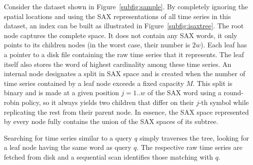 Consider the dataset shown in Figure~\ref{subfig:sample}. By completely ignoring the spatial locations and using the SAX representations of all time series in this dataset, an \isax index \cite{shieh2008kdd} can be built as illustrated in Figure~\ref{subfig:isaxtree}. The root node captures the complete \isax space. It does not contain any SAX words, it only points to its children nodes (in the worst case, their number is $2w$). Each leaf has a pointer to a disk file containing the raw time series that it represents. The leaf itself also stores the \isax word of highest cardinality among these time series. An internal node designates a split in SAX space and is created when the number of time series contained by a leaf node exceeds a fixed capacity $M$. This split is binary and is made at a given position $j=1..w$ of the SAX word using a round-robin policy, so it always yields two children that differ on their $j$-th symbol while replicating the rest from their parent node. In essence, the SAX space represented by every node fully contains the union of the SAX spaces of its subtree.

Searching for time series similar to a query $q$ simply traverses the \isax tree, looking for a leaf node having the same \isax word as query $q$. The respective raw time series are fetched from disk and a sequential scan identifies those matching with $q$. 





